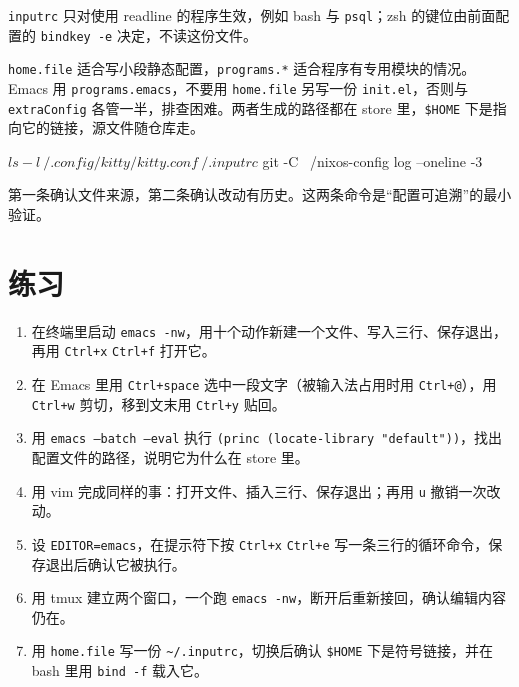 \texttt{inputrc} 只对使用 readline 的程序生效，例如 bash 与 \texttt{psql}；zsh 的键位由前面配置的 \texttt{bindkey -e} 决定，不读这份文件。

\texttt{home.file} 适合写小段静态配置，\texttt{programs.*} 适合程序有专用模块的情况。Emacs 用 \texttt{programs.emacs}，不要用 \texttt{home.file} 另写一份 \texttt{init.el}，否则与 \texttt{extraConfig} 各管一半，排查困难。两者生成的路径都在 store 里，\texttt{\$HOME} 下是指向它的链接，源文件随仓库走。

\begin{shellsession}
$ ls -l ~/.config/kitty/kitty.conf ~/.inputrc
$ git -C ~/nixos-config log --oneline -3
\end{shellsession}

第一条确认文件来源，第二条确认改动有历史。这两条命令是“配置可追溯”的最小验证。

\section{练习}

\begin{enumerate}
  \item 在终端里启动 \texttt{emacs -nw}，用十个动作新建一个文件、写入三行、保存退出，再用 \texttt{Ctrl+x} \texttt{Ctrl+f} 打开它。
  \item 在 Emacs 里用 \texttt{Ctrl+space} 选中一段文字（被输入法占用时用 \texttt{Ctrl+@}），用 \texttt{Ctrl+w} 剪切，移到文末用 \texttt{Ctrl+y} 贴回。
  \item 用 \texttt{emacs --batch --eval} 执行 \texttt{(princ (locate-library "default"))}，找出配置文件的路径，说明它为什么在 store 里。
  \item 用 vim 完成同样的事：打开文件、插入三行、保存退出；再用 \texttt{u} 撤销一次改动。
  \item 设 \texttt{EDITOR=emacs}，在提示符下按 \texttt{Ctrl+x} \texttt{Ctrl+e} 写一条三行的循环命令，保存退出后确认它被执行。
  \item 用 tmux 建立两个窗口，一个跑 \texttt{emacs -nw}，断开后重新接回，确认编辑内容仍在。
  \item 用 \texttt{home.file} 写一份 \texttt{\textasciitilde/.inputrc}，切换后确认 \texttt{\$HOME} 下是符号链接，并在 bash 里用 \texttt{bind -f} 载入它。
\end{enumerate}

